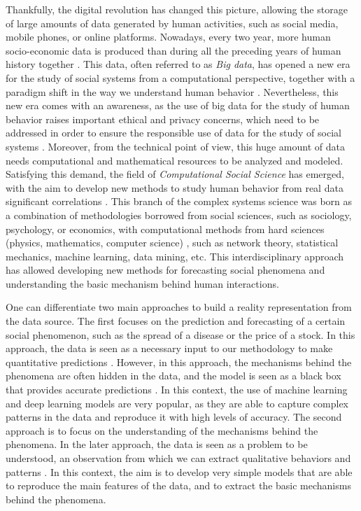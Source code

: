 Thankfully, the digital revolution has changed this picture, allowing the storage of large amounts of data generated by human activities, such as social media, mobile phones, or online platforms. Nowadays, every two year, more human socio-economic data is produced than during all the preceding years of human history together \cite{karsai2019computational}. This data, often referred to as \textit{Big data}, has opened a new era for the study of social systems from a computational perspective, together with a paradigm shift in the way we understand human behavior \cite{manyika-2011}. Nevertheless, this new era comes with an awareness, as the use of big data for the study of human behavior raises important ethical and privacy concerns, which need to be addressed in order to ensure the responsible use of data for the study of social systems \cite{boyd-2012}. Moreover, from the technical point of view, this huge amount of data needs computational and mathematical resources to be analyzed and modeled. Satisfying this demand, the field of \textit{Computational Social Science} has emerged, with the aim to develop new methods to study human behavior from real data significant correlations \cite{Lazer2009CompSocSci}. This branch of the complex systems science was born as a combination of methodologies borrowed from social sciences, such as sociology, psychology, or economics, with computational methods from hard sciences (physics, mathematics, computer science) \cite{watts-2007}, such as network theory, statistical mechanics, machine learning, data mining, etc. This interdisciplinary approach has allowed developing new methods for forecasting social phenomena and understanding the basic mechanism behind human interactions. 

One can differentiate two main approaches to build a reality representation from the data source. The first focuses on the prediction and forecasting of a certain social phenomenon, such as the spread of a disease or the price of a stock. In this approach, the data is seen as a necessary input to our methodology to make quantitative predictions \cite{Lazer2009CompSocSci}. However, in this approach, the mechanisms behind the phenomena are often hidden in the data, and the model is seen as a black box that provides accurate predictions \cite{rudin-2019}. In this context, the use of machine learning \cite{murphy-2012} and deep learning \cite{goodfellow-2016} models are  very popular, as they are able to capture complex patterns in the data and reproduce it with high levels of accuracy. The second approach is to focus on the understanding of the mechanisms behind the phenomena. In the later approach, the data is seen as a problem to be understood, an observation from which we can extract qualitative behaviors and patterns \cite{axelrod2006agent}. In this context, the aim is to develop very simple models that are able to reproduce the main features of the data, and to extract the basic mechanisms behind the phenomena.

